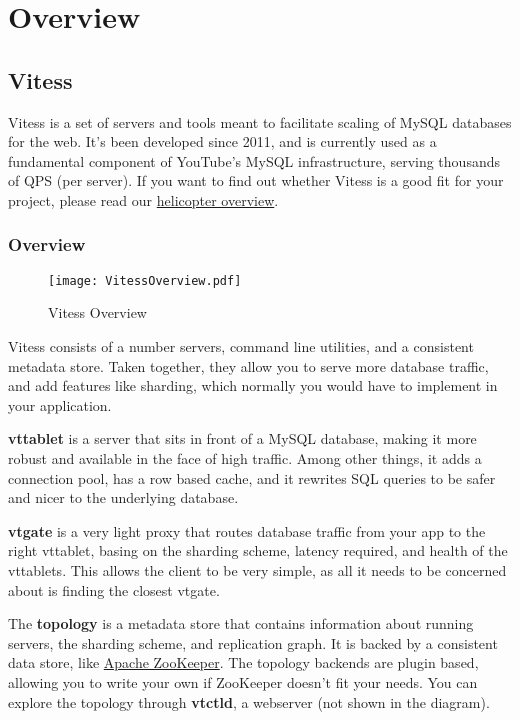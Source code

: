 \chapter{Overview}
\section{Vitess}\hypertarget{vitess}{}\label{vitess}

Vitess is a set of servers and tools meant to facilitate scaling of MySQL
databases for the web. It's been developed since 2011, and is currently used as
a fundamental component of YouTube's MySQL infrastructure, serving thousands of
QPS (per server). If you want to find out whether Vitess is a good fit for your
project, please read our \href{https://github.com/youtube/vitess/blob/master/doc/HelicopterOverview.markdown}{helicopter
overview}.


\subsection{Overview}\hypertarget{overview}{}\label{overview}

\begin{figure}[H]
\caption{Vitess Overview}
\label{fig:VitessSpectrum}
\begin{center}
\texttt{[image: VitessOverview.pdf]}
\end{center}
\end{figure}


Vitess consists of a number servers, command line utilities, and a consistent
metadata store. Taken together, they allow you to serve more database traffic,
and add features like sharding, which normally you would have to implement in your
application.

\textbf{vttablet} is a server that sits in front of a MySQL database, making it more
robust and available in the face of high traffic. Among other things, it adds a
connection pool, has a row based cache, and it rewrites SQL queries to be safer
and nicer to the underlying database.

\textbf{vtgate} is a very light proxy that routes database traffic from your app to the
right vttablet, basing on the sharding scheme, latency required, and health of
the vttablets. This allows the client to be very simple, as all it needs to be
concerned about is finding the closest vtgate.

The \textbf{topology} is a metadata store that contains information about running
servers, the sharding scheme, and replication graph. It is backed by a
consistent data store, like \href{http://zookeeper.apache.org/}{Apache ZooKeeper}.
The topology backends are plugin based, allowing you to write your own if
ZooKeeper doesn't fit your needs. You can explore the topology through
\textbf{vtctld}, a webserver (not shown in the diagram).

